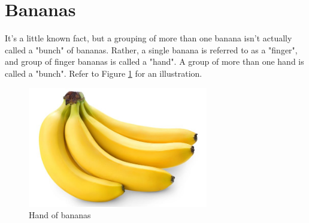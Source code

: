 \section{Bananas} \label{s:1}

It's a little known fact, but a grouping of more than one banana isn't actually called a "bunch" of bananas. Rather, a single banana is referred to as a "finger", and group of finger bananas is called a "hand". A group of more than one hand is called a "bunch". Refer to Figure \ref{img:bananas} for an illustration.

\begin{figure}[H]
    \centering
    \includegraphics[width=0.7\textwidth]{images/bananas.jpg}
    \caption{Hand of bananas}
    \label{img:bananas}
\end{figure}
